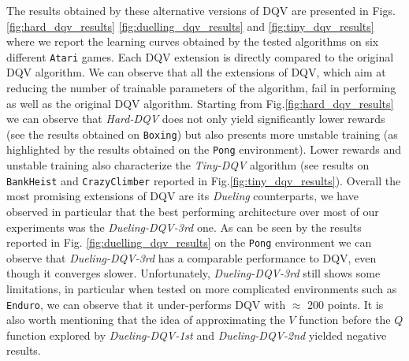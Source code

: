 The results obtained by these alternative versions of DQV are presented in Figs. \ref{fig:hard_dqv_results} \ref{fig:duelling_dqv_results} and \ref{fig:tiny_dqv_results} where we report the learning curves obtained by the tested algorithms on six different \texttt{Atari} games. Each DQV extension is directly compared to the original DQV algorithm. We can observe that all the extensions of DQV, which aim at reducing the number of trainable parameters of the algorithm, fail in performing as well as the original DQV algorithm. Starting from Fig.\ref{fig:hard_dqv_results} we can observe that \textit{Hard-DQV} does not only yield significantly lower rewards (see the results obtained on \texttt{Boxing}) but also presents more unstable training (as highlighted by the results obtained on the \texttt{Pong} environment). Lower rewards and unstable training also characterize the \textit{Tiny-DQV} algorithm (see results on \texttt{BankHeist} and \texttt{CrazyClimber} reported in Fig.\ref{fig:tiny_dqv_results}). Overall the most promising extensions of DQV are its \textit{Dueling} counterparts, we have observed in particular that the best performing architecture over most of our experiments was the \textit{Dueling-DQV-3rd} one. As can be seen by the results reported in Fig. \ref{fig:duelling_dqv_results} on the \texttt{Pong} environment we can observe that \textit{Dueling-DQV-3rd} has a comparable performance to DQV, even though it converges slower. Unfortunately, \textit{Dueling-DQV-3rd} still shows some limitations, in particular when tested on more complicated environments such as \texttt{Enduro}, we can observe that it under-performs DQV with $\approx$ 200 points. It is also worth mentioning that the idea of approximating the $V$ function before the $Q$ function explored by \textit{Dueling-DQV-1st} and \textit{Dueling-DQV-2nd} yielded negative results.






